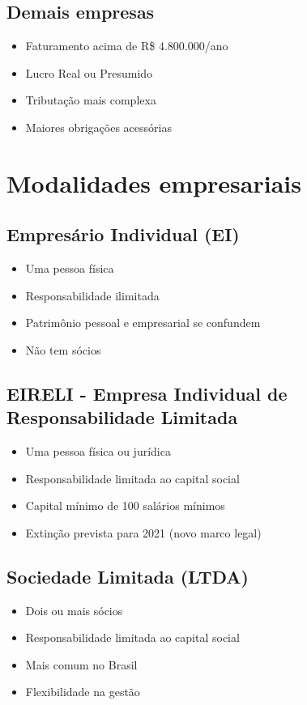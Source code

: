 \documentclass[12pt,a4paper]{article}
\begin{document}
\subsection{Demais empresas}
\begin{itemize}
    \item Faturamento acima de R\$ 4.800.000/ano
    \item Lucro Real ou Presumido
    \item Tributação mais complexa
    \item Maiores obrigações acessórias
\end{itemize}

\section{Modalidades empresariais}

\subsection{Empresário Individual (EI)}
\begin{itemize}
    \item Uma pessoa física
    \item Responsabilidade ilimitada
    \item Patrimônio pessoal e empresarial se confundem
    \item Não tem sócios
\end{itemize}

\subsection{EIRELI - Empresa Individual de Responsabilidade Limitada}
\begin{itemize}
    \item Uma pessoa física ou jurídica
    \item Responsabilidade limitada ao capital social
    \item Capital mínimo de 100 salários mínimos
    \item Extinção prevista para 2021 (novo marco legal)
\end{itemize}

\subsection{Sociedade Limitada (LTDA)}
\begin{itemize}
    \item Dois ou mais sócios
    \item Responsabilidade limitada ao capital social
    \item Mais comum no Brasil
    \item Flexibilidade na gestão
\end{itemize}
\end{document}
